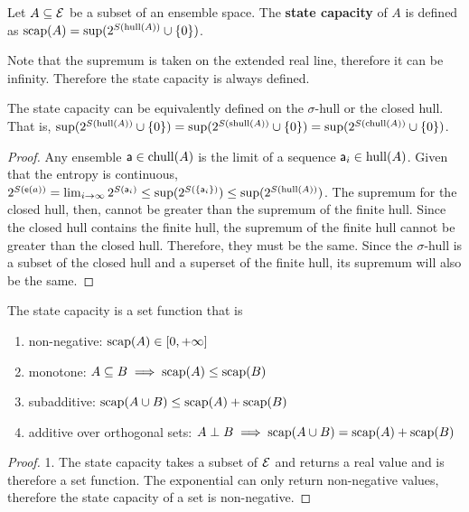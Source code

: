 \begin{mathSection}
\begin{defn}
	Let $A \subseteq \Ens$ be a subset of an ensemble space. The \textbf{state capacity} of $A$ is defined as $\scap(A) = \sup(2^{S(\hull(A))}\cup\{0\})$.
\end{defn}

\begin{check}
	Note that the supremum is taken on the extended real line, therefore it can be infinity. Therefore the state capacity is always defined.
\end{check}

\begin{coro}
	The state capacity can be equivalently defined on the $\sigma$-hull or the closed hull. That is, $\sup(2^{S(\hull(A))}\cup\{0\}) = \sup(2^{S(\shull(A))}\cup\{0\}) = \sup(2^{S(\chull(A))}\cup\{0\})$.
\end{coro}

\begin{proof}
	Any ensemble $\ens[a] \in \chull(A)$ is the limit of a sequence $\ens[a]_i \in \hull(A)$. Given that the entropy is continuous, $2^{S(\ens(a))} = \lim_{i \to \infty} 2^{S(\ens[a]_i)} \leq \sup(2^{S(\{\ens[a]_i\})}) \leq \sup(2^{S(\hull(A))})$. The supremum for the closed hull, then, cannot be greater than the supremum of the finite hull. Since the closed hull contains the finite hull, the supremum of the finite hull cannot be greater than the closed hull. Therefore, they must be the same. Since the $\sigma$-hull is a subset of the closed hull and a superset of the finite hull, its supremum will also be the same.
\end{proof}

\begin{prop}
	The state capacity is a set function that is
	\begin{enumerate}
		\item non-negative: $\scap(A) \in [0, +\infty]$
		\item monotone: $A \subseteq B \implies \scap(A) \leq \scap(B)$
		\item subadditive: $\scap(A \cup B) \leq \scap(A) + \scap(B)$
		\item additive over orthogonal sets: $A \ortho B \implies \scap(A \cup B) = \scap(A) + \scap(B)$ 
	\end{enumerate}
\end{prop}

\begin{proof}
	1. The state capacity takes a subset of $\Ens$ and returns a real value and is therefore a set function. The exponential can only return non-negative values, therefore the state capacity of a set is non-negative. 
	

\end{proof}
\end{mathSection}
